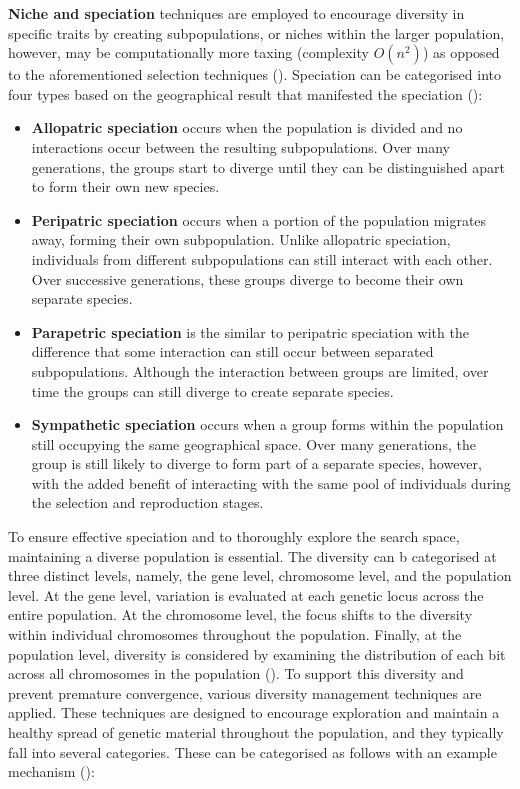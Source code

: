 \parbreak\noindent \textbf{Niche and speciation} techniques are employed to encourage diversity in specific traits by creating subpopulations, or niches within the larger population, however, may be computationally more taxing (complexity $O(n^2)$) as opposed to the aforementioned selection techniques (\cite{back2012handbook}). Speciation can be categorised into four types based on the geographical result that manifested the speciation (\cite{michaelCilliers}):
\begin{itemize}
	\item \textbf{Allopatric speciation} occurs when the population is divided and no interactions occur between the resulting sub\-populations. Over many generations, the groups start to diverge until they can be distinguished apart to form their own new species.
	\item \textbf{Peripatric speciation} occurs when a portion of the population migrates away, forming their own sub\-population. Unlike allopatric speciation, individuals from different sub\-populations can still interact with each other. Over successive generations, these groups diverge to become their own separate species.
	\item \textbf{Parapetric speciation} is the similar to peripatric speciation with the difference that some interaction can still occur between separated sub\-populations. Although the interaction between groups are limited, over time the groups can still diverge to create separate species.
	\item \textbf{Sympathetic speciation} occurs when a group forms within the population still occupying the same geographical space. Over many generations, the group is still likely to diverge to form part of a separate species, however, with the added benefit of interacting with the same pool of individuals during the selection and reproduction stages. 
\end{itemize}

\noindent To ensure effective speciation and to thoroughly explore the search space, maintaining a diverse population is essential. The diversity can b categorised at three distinct levels, namely, the gene level, chromosome level, and the population level. At the gene level, variation is evaluated at each genetic locus across the entire population. At the chromosome level, the focus shifts to the diversity within individual chromosomes throughout the population. Finally, at the population level, diversity is considered by examining the distribution of each bit across all chromosomes in the population (\cite{diaz2007initial}). To support this diversity and prevent premature convergence, various diversity management techniques are applied. These techniques are designed to encourage exploration and maintain a healthy spread of genetic material throughout the population, and they typically fall into several categories. These can be categorised as follows with an example mechanism (\cite{segura2016importance}):


